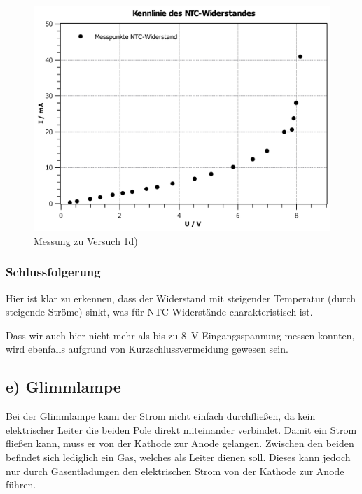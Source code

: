 \documentclass[11pt,a4paper,titlepage, ngerman]{article}
\begin{document}
				\begin{figure}
					\centering
					\includegraphics[width=\textwidth]{KennlinieNTCsubgitter.pdf}
					\caption{Messung zu Versuch 1d)}
					\label{KL d}
				\end{figure}
			
			\subsubsection*{Schlussfolgerung}
			
				Hier ist klar zu erkennen, dass der Widerstand mit steigender Temperatur (durch steigende Ströme) sinkt, was für NTC-Widerstände charakteristisch ist. 
				
				Dass wir auch hier nicht mehr als bis zu \SI{8}{\V} Eingangsspannung messen konnten, wird ebenfalls aufgrund von Kurzschlussvermeidung gewesen sein.
			
		\subsection{e) Glimmlampe} 
			
			Bei der Glimmlampe kann der Strom nicht einfach durchfließen, da kein elektrischer Leiter die beiden Pole direkt miteinander verbindet.
			Damit ein Strom fließen kann, muss er von der Kathode zur Anode gelangen.
			Zwischen den beiden befindet sich lediglich ein Gas, welches als Leiter dienen soll.
			Dieses kann jedoch nur durch Gasentladungen den elektrischen Strom von der Kathode zur Anode führen.
			
\end{document}
